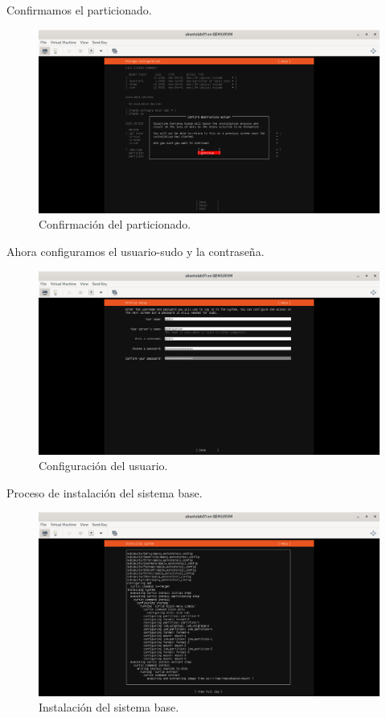 Confirmamos el particionado.

\begin{figure}[H]
	\centering
	\includegraphics[scale=0.30]{14}
	\caption{Confirmación del particionado.}
\end{figure}

Ahora configuramos el usuario-sudo y la contraseña.

\begin{figure}[H]
	\centering
	\includegraphics[scale=0.30]{15}
	\caption{Configuración del usuario.}
\end{figure}

Proceso de instalación del sistema base.

\begin{figure}[H]
	\centering
	\includegraphics[scale=0.30]{16}
	\caption{Instalación del sistema base.}
\end{figure}


